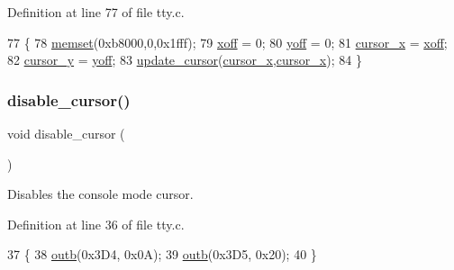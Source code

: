 Definition at line 77 of file tty.\+c.


\begin{DoxyCode}
77                    \{
78     \hyperlink{a00125_a9e432f267691eceb2e2e0efcc37efbc9_a9e432f267691eceb2e2e0efcc37efbc9}{memset}(0xb8000,0,0x1fff);
79     \hyperlink{a00167_abaa0d20f0e52ce0d3a7d706f6ac16266_abaa0d20f0e52ce0d3a7d706f6ac16266}{xoff} = 0;
80     \hyperlink{a00167_a1a7539764d0ae8cd06ce45c62cf92bca_a1a7539764d0ae8cd06ce45c62cf92bca}{yoff} = 0;
81     \hyperlink{a00167_ae69604af0f9bd5fca2a016d0aa1ba7e1_ae69604af0f9bd5fca2a016d0aa1ba7e1}{cursor\_x} = \hyperlink{a00167_abaa0d20f0e52ce0d3a7d706f6ac16266_abaa0d20f0e52ce0d3a7d706f6ac16266}{xoff};
82     \hyperlink{a00167_a0301c5492919c401c2c1ecf52af709b0_a0301c5492919c401c2c1ecf52af709b0}{cursor\_y} = \hyperlink{a00167_a1a7539764d0ae8cd06ce45c62cf92bca_a1a7539764d0ae8cd06ce45c62cf92bca}{yoff};
83     \hyperlink{a00167_a492f5021d7340613e732ef37bbaa04e4_a492f5021d7340613e732ef37bbaa04e4}{update\_cursor}(\hyperlink{a00167_ae69604af0f9bd5fca2a016d0aa1ba7e1_ae69604af0f9bd5fca2a016d0aa1ba7e1}{cursor\_x},\hyperlink{a00167_ae69604af0f9bd5fca2a016d0aa1ba7e1_ae69604af0f9bd5fca2a016d0aa1ba7e1}{cursor\_x});
84 \}
\end{DoxyCode}
\mbox{\label{a00167_a3d09038c7b6436e60b228f2f3f451f6a_a3d09038c7b6436e60b228f2f3f451f6a}} 
\subsubsection{\texorpdfstring{disable\+\_\+cursor()}{disable\_cursor()}}
{\footnotesize\ttfamily void disable\+\_\+cursor (\begin{DoxyParamCaption}{ }\end{DoxyParamCaption})}



Disables the console mode cursor. 



Definition at line 36 of file tty.\+c.


\begin{DoxyCode}
37 \{
38     \hyperlink{a00158_aa37f5841c54156a4b14fc0d6f626b44f_aa37f5841c54156a4b14fc0d6f626b44f}{outb}(0x3D4, 0x0A);
39     \hyperlink{a00158_aa37f5841c54156a4b14fc0d6f626b44f_aa37f5841c54156a4b14fc0d6f626b44f}{outb}(0x3D5, 0x20);
40 \}
\end{DoxyCode}
\mbox{\label{a00167_acb9a978008cfa67b0038e85eb56d2d41_acb9a978008cfa67b0038e85eb56d2d41}} 
